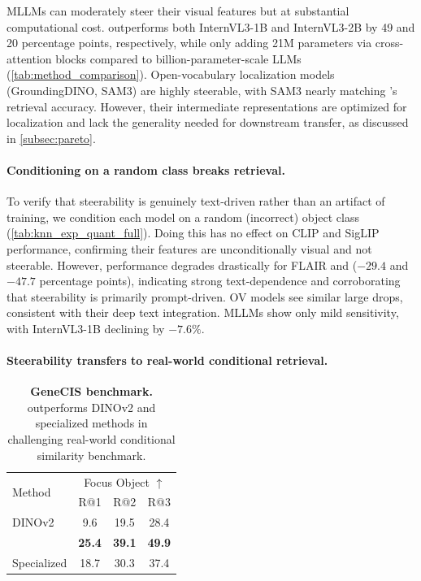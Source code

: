 MLLMs can moderately steer their visual features but at substantial computational cost.
\model{} outperforms both InternVL3-1B and InternVL3-2B by 49 and 20 percentage points, respectively, while only adding 21M parameters via cross-attention blocks compared to billion-parameter-scale LLMs (\cref{tab:method_comparison}).
Open-vocabulary localization models (GroundingDINO, SAM3) are highly steerable, with SAM3 nearly matching \model{}'s retrieval accuracy.
However, their intermediate representations are optimized for localization and lack the generality needed for downstream transfer, as discussed in \cref{subsec:pareto}.


\paragraph{Conditioning on a random class breaks retrieval.}

To verify that steerability is genuinely text-driven rather than an artifact of training, we condition each model on a random (incorrect) object class (\cref{tab:knn_exp_quant_full}).
Doing this has no effect on CLIP and SigLIP performance, confirming their features are unconditionally visual and not steerable.
However, performance degrades drastically for FLAIR and \model{} ($-29.4$ and $-47.7$ percentage points), indicating strong text-dependence and corroborating that steerability is primarily prompt-driven.
OV models see similar large drops, consistent with their deep text integration.
MLLMs show only mild sensitivity, with InternVL3-1B declining by $-7.6\%$.

\paragraph{Steerability transfers to real-world conditional retrieval.}

\begin{table}
\centering
\footnotesize
\tabcolsep=1.2mm
\vspace{-10mm}
\caption{%
\textbf{GeneCIS benchmark.}
\model{} outperforms DINOv2 and specialized methods in challenging real-world conditional similarity benchmark.
}
\label{tab:geneCIS}
\begin{tabular}{l ccc}
\toprule
\multirow{2}{*}{Method} & \multicolumn{3}{c}{Focus Object $\uparrow$} \\
& R@1 & R@2 & R@3 \\
\midrule
DINOv2 & 9.6 & 19.5 & 28.4 \\
\rowcolor{\methodcolor}\textbf{\model{}} & \textbf{25.4} & \textbf{39.1} & \textbf{49.9} \\
\color{gray}Specialized & \color{gray}18.7 & \color{gray}30.3 & \color{gray}37.4 \\
\bottomrule
\end{tabular}
\vspace{-6mm}
\end{table}

